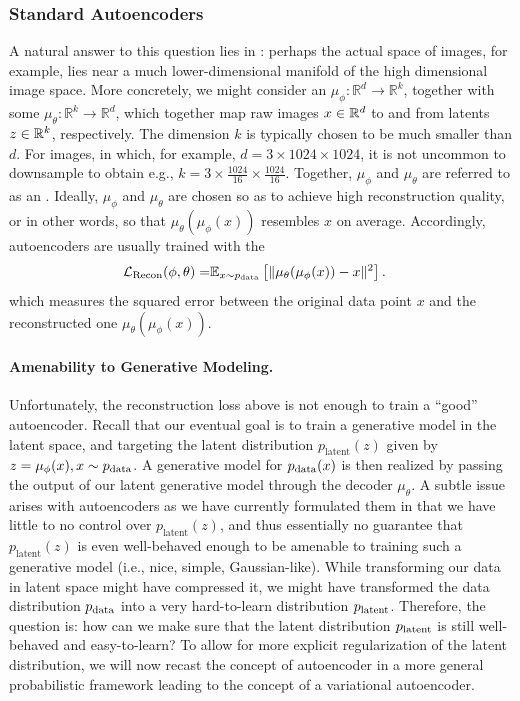 \subsubsection{Standard Autoencoders}
A natural answer to this question lies in : perhaps the actual space of images, for example, lies near a much lower-dimensional manifold of the high dimensional image space. More concretely, we might consider an  $\mu_{\phi}: \mathbb{R}^d \to \mathbb{R}^k$, together with some  $\mu_{\theta}: \mathbb{R}^k \to \mathbb{R}^d$, which together map raw images $x \in \mathbb{R}^d$ to and from latents $z\in\mathbb{R}^k$, respectively. The dimension $k$ is typically chosen to be much smaller than $d$. For images, in which, for example, $d = 3 \times 1024 \times 1024$, it is not uncommon to downsample to obtain e.g., $k = 3 \times \tfrac{1024}{16} \times \tfrac{1024}{16}$. Together, $\mu_{\phi}$ and $\mu_{\theta}$ are referred to as an . Ideally, $\mu_{\phi}$ and $\mu_{\theta}$ are chosen so as to achieve high reconstruction quality, or in other words, so that $\mu_{\theta}(\mu_{\phi}(x))$ resembles $x$ on average. Accordingly, autoencoders are usually trained with the 
\begin{align*}
\mathcal{L}_{\text{Recon}}(\phi,\theta)=&\mathbb{E}_{x\sim p_{\rm{data}}}\left[\|\mu_\theta(\mu_\phi(x))-x\|^2\right].
\end{align*}
which measures the squared error between the original data point $x$ and the reconstructed one $\mu_\theta(\mu_\phi(x))$.

\paragraph{Amenability to Generative Modeling.} Unfortunately, the reconstruction loss above is not enough to train a ``good'' autoencoder. Recall that our eventual goal is to train a generative model in the latent space, and targeting the latent distribution $p_{\text{latent}}(z)$ given by $z = \mu_{\phi}(x), x \sim p_{\rm{data}}$. A generative model for $p_{\rm{data}}(x)$ is then realized by passing the output of our latent generative model through the decoder $\mu_{\theta}$. A subtle issue arises with autoencoders as we have currently formulated them in that we have little to no control over $p_{\text{latent}}(z)$, and thus essentially no guarantee that $p_{\text{latent}}(z)$ is even well-behaved enough to be amenable to training such a generative model (i.e., nice, simple, Gaussian-like). While transforming our data in latent space might have compressed it, we might have transformed the data distribution $p_{\rm{data}}$ into a very hard-to-learn distribution $p_{\text{latent}}$. Therefore, the question is: how can we make sure that the latent distribution $p_{\text{latent}}$ is still well-behaved and easy-to-learn? To allow for more explicit regularization of the latent distribution, we will now recast the concept of autoencoder in a more general probabilistic framework leading to the concept of a variational autoencoder.

